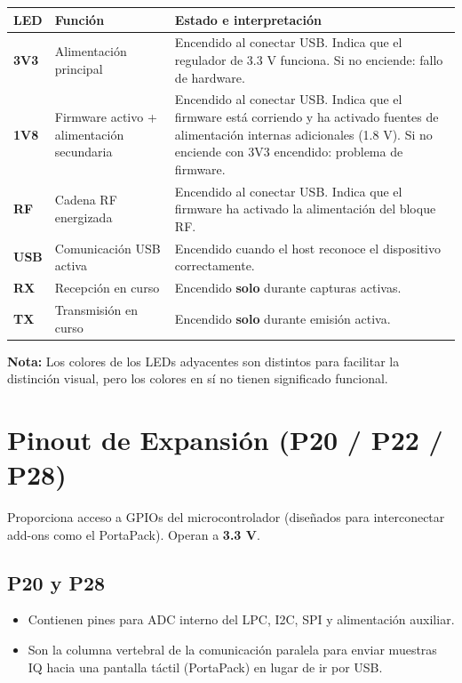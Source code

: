 \documentclass[11pt]{article}
\begin{document}
\begin{table}[h]
    \centering
    \begin{tabular}{p{}p{}p{}}
        \toprule
        \textbf{LED} & \textbf{Función} & \textbf{Estado e interpretación} \\
        \midrule
        \textbf{3V3} & Alimentación principal & Encendido al conectar USB. Indica que el regulador de 3.3 V funciona. Si no enciende: fallo de hardware. \\
        \addlinespace
        \textbf{1V8} & Firmware activo + alimentación secundaria & Encendido al conectar USB. Indica que el firmware está corriendo y ha activado fuentes de alimentación internas adicionales (1.8 V). Si no enciende con 3V3 encendido: problema de firmware. \\
        \addlinespace
        \textbf{RF}  & Cadena RF energizada & Encendido al conectar USB. Indica que el firmware ha activado la alimentación del bloque RF. \\
        \addlinespace
        \textbf{USB} & Comunicación USB activa & Encendido cuando el host reconoce el dispositivo correctamente. \\
        \addlinespace
        \textbf{RX}  & Recepción en curso & Encendido \textbf{solo} durante capturas activas. \\
        \addlinespace
        \textbf{TX}  & Transmisión en curso & Encendido \textbf{solo} durante emisión activa. \\
        \bottomrule
    \end{tabular}
\end{table}

\textbf{Nota:} Los colores de los LEDs adyacentes son distintos para facilitar la distinción visual, pero los colores en sí no tienen significado funcional.

\section{Pinout de Expansión (P20 / P22 / P28)}

Proporciona acceso a GPIOs del microcontrolador (diseñados para interconectar add-ons como el PortaPack). Operan a \textbf{3.3 V}.

\subsection*{P20 y P28}
\begin{itemize}
    \item Contienen pines para ADC interno del LPC, I2C, SPI y alimentación auxiliar.
    \item Son la columna vertebral de la comunicación paralela para enviar muestras IQ hacia una pantalla táctil (PortaPack) en lugar de ir por USB.
\end{itemize}
\end{document}
